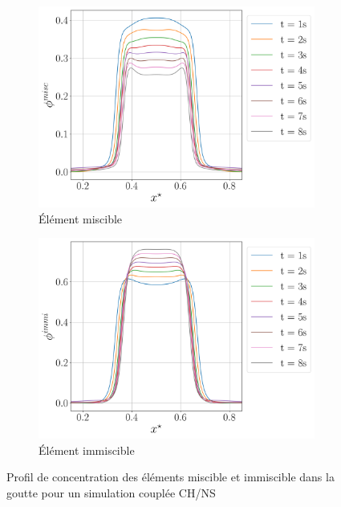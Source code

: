 \begin{figure}[H]
	\centering
	\begin{subfigure}[H]{0.45\textwidth}
		\centering
		\includegraphics[width=1.1\textwidth]{figure/miscible_NS.png}
		\caption{Élément miscible}
		\label{fig:y equals x}
	\end{subfigure} \hfill
	\begin{subfigure}[H]{0.45\textwidth}
		\centering
		\includegraphics[width=1.1\textwidth]{figure/immiscible_NS.png}
		\caption{Élément immiscible}
		\label{fig:y equals x}
	\end{subfigure}
	\caption{Profil de concentration des éléments miscible et immiscible dans la goutte pour un simulation couplée CH/NS}
	\label{fig:verifcouplage}
\end{figure}




